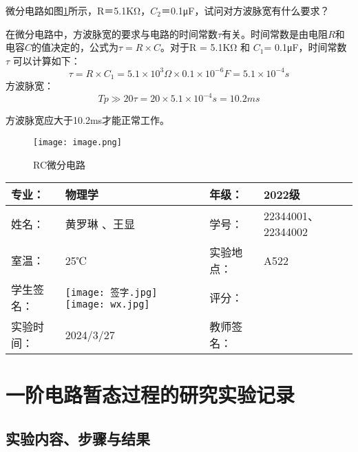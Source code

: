 \documentclass[dvipsnames, svgnames,a4paper,11pt]{article}
\begin{document}
	\begin{question}
		微分电路如图\ref*{fig:graph1}所示，R＝5.1KΩ，$C_2$＝0.1μF，试问对方波脉宽有什么要求？
	\end{question}



		在微分电路中，方波脉宽的要求与电路的时间常数$\tau$有关。时间常数是由电阻$R$和电容$C$的值决定的，公式为$ \tau = R \times C$。对于R = 5.1KΩ 和 $C_1$​ = 0.1μF，时间常数 $\tau$ 可以计算如下：
		\[
			\tau=R\times C_1​=5.1\times10^3\Omega×0.1×10^{−6}F=5.1×10^{−4}s
		\]
		方波脉宽：
		\[
			Tp\gg20\tau=20×5.1×10^{−4}s=10.2ms
		\]
		
		方波脉宽应大于10.2ms才能正常工作。

		\begin{figure}[htbp]
			\centering
			\texttt{[image: image.png]}
			\caption{RC微分电路}
			\label{fig:graph1}
		\end{figure}

	
	
	
	
	
	\clearpage
	
	\begin{table}
		\renewcommand\arraystretch{1.7}
		\centering
		\begin{tabularx}{\textwidth}{|X|X|X|X|}
			\hline
			专业： & 物理学 & 年级： & 2022级 \\
			\hline
			姓名： & 黄罗琳 、王显& 学号： &22344001、22344002 \\
			\hline
			室温： & 25℃ & 实验地点： & A522 \\
			\hline
			学生签名：& \texttt{[image: 签字.jpg]} \texttt{[image: wx.jpg]} & 评分： &\\
			\hline
			实验时间：& 2024/3/27 & 教师签名：&\\
			\hline
		\end{tabularx}
	\end{table}
	
	\section{一阶电路暂态过程的研究\quad\heiti 实验记录}
	
	\subsection{实验内容、步骤与结果}
	
\end{document}

